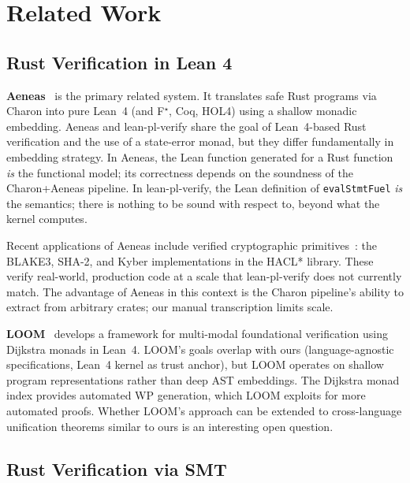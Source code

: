 
\section{Related Work}
\label{sec:related}

\subsection{Rust Verification in Lean 4}

\textbf{Aeneas}~\cite{ho2022aeneas} is the primary related system. It translates
safe Rust programs via Charon into pure Lean~4 (and F$^\star$, Coq, HOL4)
using a shallow monadic embedding. Aeneas and lean-pl-verify share the goal
of Lean~4-based Rust verification and the use of a state-error monad, but
they differ fundamentally in embedding strategy. In Aeneas, the Lean function
generated for a Rust function \emph{is} the functional model; its correctness
depends on the soundness of the Charon+Aeneas pipeline. In lean-pl-verify,
the Lean definition of \texttt{evalStmtFuel} \emph{is} the semantics; there
is nothing to be sound with respect to, beyond what the kernel computes.

Recent applications of Aeneas include verified cryptographic
primitives~\cite{aeneascrypto2026}: the BLAKE3, SHA-2, and Kyber
implementations in the HACL* library. These verify real-world, production
code at a scale that lean-pl-verify does not currently match. The advantage
of Aeneas in this context is the Charon pipeline's ability to extract from
arbitrary crates; our manual transcription limits scale.

\textbf{LOOM}~\cite{loom2026} develops a framework for multi-modal
foundational verification using Dijkstra monads in Lean~4. LOOM's goals
overlap with ours (language-agnostic specifications, Lean~4 kernel as trust
anchor), but LOOM operates on shallow program representations rather than
deep AST embeddings. The Dijkstra monad index provides automated WP
generation, which LOOM exploits for more automated proofs. Whether LOOM's
approach can be extended to cross-language unification theorems similar to
ours is an interesting open question.

\subsection{Rust Verification via SMT}

